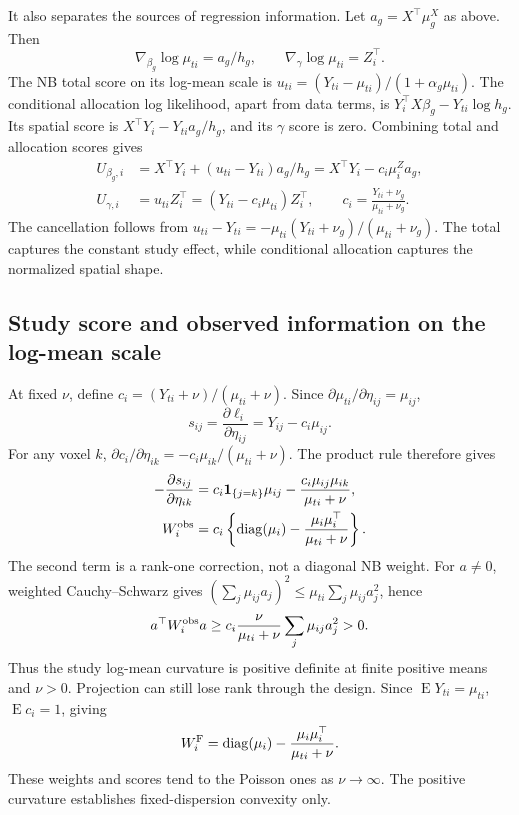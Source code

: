 \documentclass[11pt,a4paper]{article}
\newcommand{\E}{\operatorname{E}}
\newcommand{\diag}{\operatorname{diag}}
\numberwithin{equation}{section}
\begin{document}
It also separates the sources of regression information.
Let $a_g=X^\top\mu_g^X$ as above. Then
\[
 \nabla_{\beta_g}\log\mu_{ti}=a_g/h_g,\qquad
 \nabla_\gamma\log\mu_{ti}=Z_i^\top.
\]
The NB total score on its log-mean scale is
$u_{ti}=(Y_{ti}-\mu_{ti})/(1+\alpha_g\mu_{ti})$.
The conditional allocation log likelihood, apart from data terms, is
$Y_i^\top X\beta_g-Y_{ti}\log h_g$.
Its spatial score is $X^\top Y_i-Y_{ti}a_g/h_g$, and its $\gamma$
score is zero. Combining total and allocation scores gives
\begin{align}
 U_{\beta_g,i}
 &=X^\top Y_i+(u_{ti}-Y_{ti})a_g/h_g
   =X^\top Y_i-c_i\mu_i^Z a_g,\\
 U_{\gamma,i}
 &=u_{ti}Z_i^\top=(Y_{ti}-c_i\mu_{ti})Z_i^\top,
 \qquad c_i=\frac{Y_{ti}+\nu_g}{\mu_{ti}+\nu_g}.
\end{align}
The cancellation follows from
$u_{ti}-Y_{ti}=-\mu_{ti}(Y_{ti}+\nu_g)/(\mu_{ti}+\nu_g)$.
The total captures the constant study effect, while conditional
allocation captures the normalized spatial shape.

\subsection{Study score and observed information on the log-mean scale}
At fixed $\nu$, define $c_i=(Y_{ti}+\nu)/({\mu_{ti}}+\nu)$.
Since $\partial {\mu_{ti}}/\partial\eta_{ij}=\mu_{ij}$,
\begin{equation}
 s_{ij}=\frac{\partial\ell_i}{\partial\eta_{ij}}
          =Y_{ij}-c_i\mu_{ij}.
\end{equation}
For any voxel $k$,
$\partial c_i/\partial\eta_{ik}=-c_i\mu_{ik}/({\mu_{ti}}+\nu)$.
The product rule therefore gives
\begin{align}
 -\frac{\partial s_{ij}}{\partial\eta_{ik}}
 &=c_i\mathbf1_{\{j=k\}}\mu_{ij}
              -\frac{c_i\mu_{ij}\mu_{ik}}{{\mu_{ti}}+\nu},\\
 W_i^{\rm obs}
 &=c_i\left\{\diag(\mu_i)-\frac{\mu_i\mu_i^\top}{{\mu_{ti}}+\nu}\right\}.
 \label{eq:cluster-W}
\end{align}
The second term is a rank-one correction, not a diagonal NB weight.
For $a\ne0$, weighted Cauchy--Schwarz gives
$(\sum_j\mu_{ij}a_j)^2\leq {\mu_{ti}}\sum_j\mu_{ij}a_j^2$, hence
\begin{equation}
 a^\top W_i^{\rm obs}a
 \geq c_i\frac{\nu}{{\mu_{ti}}+\nu}\sum_j\mu_{ij}a_j^2>0 .
\end{equation}
Thus the study log-mean curvature is positive definite at finite positive
means and $\nu>0$. Projection can still lose rank through the design.
Since $\E Y_{ti}={\mu_{ti}}$, $\E c_i=1$, giving
\begin{equation}
 W_i^{\rm F}=\diag(\mu_i)-\frac{\mu_i\mu_i^\top}{{\mu_{ti}}+\nu}.
\end{equation}
These weights and scores tend to the Poisson ones as $\nu\to\infty$.
The positive curvature establishes fixed-dispersion convexity only.
\end{document}
